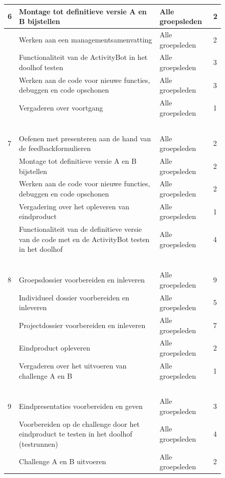 \documentclass[oneside]{book}
\begin{document}
	\begin{figure}[H]\begin{adjustwidth}{-3.5cm}{}
	\begin{tabular}{ | l | l | l | l | }
	\hline
	6 & Montage tot definitieve versie A en B bijstellen & Alle groepsleden & 2 \\ \hline
	 & Werken aan een managementsamenvatting & Alle groepsleden & 2 \\ \hline
	 & Functionaliteit van de ActivityBot in het doolhof testen & Alle groepsleden & 3 \\ \hline
	 & Werken aan de code voor nieuwe functies, debuggen en code opschonen & Alle groepsleden & 3 \\ \hline
	 & Vergaderen over voortgang  & Alle groepsleden & 1 \\ \hline
	 & \  & \  & \  \\ \hline
	7 & Oefenen met presenteren aan de hand van de feedbackformulieren & Alle groepsleden & 2 \\ \hline
	 & Montage tot definitieve versie A en B bijstellen & Alle groepsleden & 2 \\ \hline
	 & Werken aan de code voor nieuwe functies, debuggen en code opschonen & Alle groepsleden & 2 \\ \hline
	 & Vergadering over het opleveren van eindproduct  & Alle groepsleden & 1 \\ \hline
	 & Functionaliteit van de definitieve versie van de code met en de ActivityBot testen in het doolhof & Alle groepsleden & 4 \\ \hline
	 & \  & \  & \  \\ \hline
	8 & Groepsdossier voorbereiden en  inleveren & Alle groepsleden & 9 \\ \hline
	 & Individueel dossier voorbereiden en inleveren & Alle groepsleden & 5 \\ \hline
	 & Projectdossier voorbereiden en inleveren & Alle groepsleden & 7 \\ \hline
	 & Eindproduct opleveren & Alle groepsleden & 2 \\ \hline
	 & Vergaderen over het uitvoeren van challenge A en B & Alle groepsleden & 1 \\ \hline
	 & \  & \  & \  \\ \hline
	9 & Eindpresentaties voorbereiden en geven & Alle groepsleden & 3 \\ \hline
	 & Voorbereiden op de challenge door het eindproduct te testen in het doolhof (testrunnen) & Alle groepsleden & 4 \\ \hline
	 & Challenge A en B uitvoeren & Alle groepsleden & 2 \\ \hline
\end{tabular}
\end{adjustwidth}\end{figure}
\end{document}

